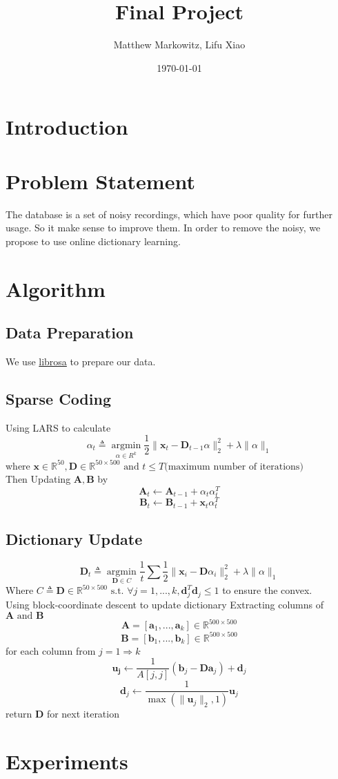 \documentclass[UTF8]{article}
\title{Final Project}
\author{Matthew Markowitz, Lifu Xiao}
\date{\today}
\begin{document}
    \maketitle
    \section{Introduction}

    \section{Problem Statement}
    The database is a set of noisy recordings, which have poor quality for further usage. So it make sense  to improve them. In order to remove the noisy, we propose to use online dictionary learning.
    
    
    \section{Algorithm}
    
    \subsection{Data Preparation}
    We use \href{https://librosa.github.io/librosa/}{librosa} to prepare our data. 
    
    \subsection{Sparse Coding}
    Using LARS to calculate
    \[
        \alpha_t \triangleq \mathop{\arg\min}\limits_{\alpha\in R^k} \frac{1}{2} \| \bm{x}_t - \bm{D}_{t-1} \alpha  \|^2_2 + \lambda \|\alpha\|_1
    \]
    where $\bm{x} \in \mathbb{R}^{50}, \bm{D} \in \mathbb{R}^{50 \times 500} \text{ and } t \leq T \text{(maximum number of iterations)}$
    \\
    Then Updating $\bm{A}, \bm{B}$ by
    \[\bm{A}_t \leftarrow \bm{A}_{t-1} + \alpha_t \alpha_t^T\]
    \[\bm{B}_t \leftarrow \bm{B}_{t-1} + \bm{x}_t \alpha_t^T\]
    
    \subsection{Dictionary Update}
    \[\bm{D}_t \triangleq \mathop{\arg\min}\limits_{\bm{D} \in C} \frac{1}{t} \sum{ \frac{1}{2} \| \bm{x}_i - \bm{D} \alpha_i  \|^2_2 + \lambda \|\alpha\|_1}
    \]
    Where $C \triangleq {\bm{D} \in \mathbb{R}^{50 \times 500} \text{ s.t. } \forall j = 1, ..., k, \bm{d}_j^T\bm{d}_j \leq 1}$ to ensure the convex.
    \\
    Using block-coordinate descent to update dictionary
    Extracting columns of $\bm{A} \text{ and } \bm{B}$
    \[\bm{A} = [\bm{a}_1, ..., \bm{a}_k] \in \mathbb{R}^{500 \times 500}\]
    \[\bm{B} = [\bm{b}_1, ..., \bm{b}_k] \in \mathbb{R}^{500 \times 500}\]
    for each column from $j = 1 \Rightarrow k$
    \[\bm{u_j} \leftarrow \frac{1}{A[j, j]}(\bm{b}_j - \bm{Da}_j) + \bm{d}_j\]
    \[\bm{d}_j \leftarrow \frac{1}{\max(\|\bm{u}_j\|_2, 1)}\bm{u}_j\]
    return $\bm{D}$ for next iteration
    \section{Experiments}
\end{document}
